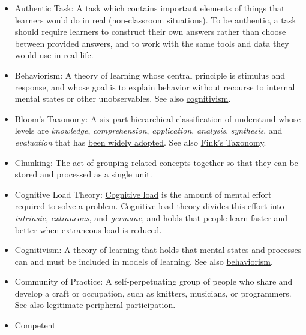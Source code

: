 \documentclass[10pt,statementpaper]{memoir}
\begin{document}
\begin{itemize}
\item
  \protect\hypertarget{authentic-task}{}{Authentic Task}: A task which
  contains important elements of things that learners would do in real
  (non-classroom situations). To be authentic, a task should require
  learners to construct their own answers rather than choose between
  provided answers, and to work with the same tools and data they would
  use in real life.
\item
  \protect\hypertarget{behaviorism}{}{Behaviorism}: A theory of learning
  whose central principle is stimulus and response, and whose goal is to
  explain behavior without recourse to internal mental states or other
  unobservables. See also \href{gloss.html\#cognitivism}{cognitivism}.
\item
  \protect\hypertarget{blooms-taxonomy}{}{Bloom's Taxonomy}: { A
  six-part hierarchical classification of understand whose levels are
  \emph{knowledge}, \emph{comprehension}, \emph{application},
  \emph{analysis}, \emph{synthesis}, and \emph{evaluation} that has
  \href{https://en.wikipedia.org/wiki/Bloom's_taxonomy}{been widely
  adopted}. See also \href{gloss.html\#finks-taxonomy}{Fink's Taxonomy}.
  }
\item
  \protect\hypertarget{chunking}{}{Chunking}: The act of grouping
  related concepts together so that they can be stored and processed as
  a single unit.
\item
  \protect\hypertarget{cognitive-load-theory}{}{Cognitive Load Theory}:
  \href{https://en.wikipedia.org/wiki/Cognitive_load}{Cognitive load} is
  the amount of mental effort required to solve a problem. Cognitive
  load theory divides this effort into \emph{intrinsic},
  \emph{extraneous}, and \emph{germane}, and holds that people learn
  faster and better when extraneous load is reduced.
\item
  \protect\hypertarget{cognitivism}{}{Cognitivism}: A theory of learning
  that holds that mental states and processes can and must be included
  in models of learning. See also
  \href{gloss.html\#behaviorism}{behaviorism}.
\item
  \protect\hypertarget{community-of-practice}{}{Community of Practice}:
  A self-perpetuating group of people who share and develop a craft or
  occupation, such as knitters, musicians, or programmers. See also
  \href{gloss.html\#legitimate-peripheral-participation}{legitimate
  peripheral participation}.
\item
  \protect\hypertarget{competent-practitioner}{}{Competent
}
\end{itemize}
\end{document}
